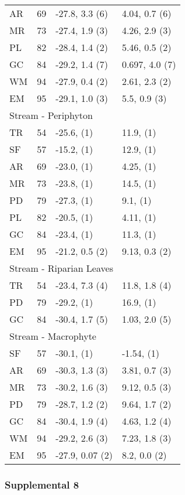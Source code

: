 \documentclass[
]{article}
\begin{document}
\begin{longtable}{llll}
AR & 69 & -27.8, 3.3 (6) & 4.04, 0.7 (6) \\ 
MR & 73 & -27.4, 1.9 (3) & 4.26, 2.9 (3) \\ 
PL & 82 & -28.4, 1.4 (2) & 5.46, 0.5 (2) \\ 
GC & 84 & -29.2, 1.4 (7) & 0.697, 4.0 (7) \\ 
WM & 94 & -27.9, 0.4 (2) & 2.61, 2.3 (2) \\ 
EM & 95 & -29.1, 1.0 (3) & 5.5, 0.9 (3) \\ 
\midrule
\multicolumn{4}{l}{Stream - Periphyton} \\ 
\midrule
TR & 54 & -25.6,     (1) & 11.9,     (1) \\ 
SF & 57 & -15.2,     (1) & 12.9,     (1) \\ 
AR & 69 & -23.0,     (1) & 4.25,     (1) \\ 
MR & 73 & -23.8,     (1) & 14.5,     (1) \\ 
PD & 79 & -27.3,     (1) & 9.1,     (1) \\ 
PL & 82 & -20.5,     (1) & 4.11,     (1) \\ 
GC & 84 & -23.4,     (1) & 11.3,     (1) \\ 
EM & 95 & -21.2, 0.5 (2) & 9.13, 0.3 (2) \\ 
\midrule
\multicolumn{4}{l}{Stream - Riparian Leaves} \\ 
\midrule
TR & 54 & -23.4, 7.3 (4) & 11.8, 1.8 (4) \\ 
PD & 79 & -29.2,     (1) & 16.9,     (1) \\ 
GC & 84 & -30.4, 1.7 (5) & 1.03, 2.0 (5) \\ 
\midrule
\multicolumn{4}{l}{Stream - Macrophyte} \\ 
\midrule
SF & 57 & -30.1,     (1) & -1.54,     (1) \\ 
AR & 69 & -30.3, 1.3 (3) & 3.81, 0.7 (3) \\ 
MR & 73 & -30.2, 1.6 (3) & 9.12, 0.5 (3) \\ 
PD & 79 & -28.7, 1.2 (2) & 9.64, 1.7 (2) \\ 
GC & 84 & -30.4, 1.9 (4) & 4.63, 1.2 (4) \\ 
WM & 94 & -29.2, 2.6 (3) & 7.23, 1.8 (3) \\ 
EM & 95 & -27.9, 0.07 (2) & 8.2, 0.0 (2) \\ 
\bottomrule
\end{longtable}

\newpage

\hypertarget{supplemental-8}{%
\subsubsection{Supplemental 8}\label{supplemental-8}}
\end{document}
